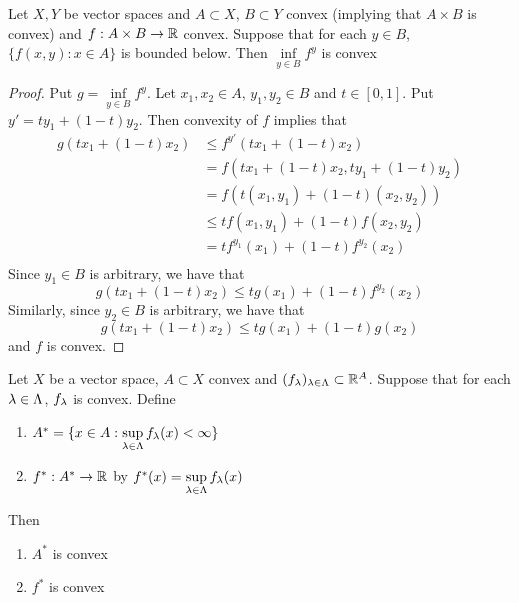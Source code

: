 \documentclass{book}
\begin{document}
	\begin{ex} 
	Let $X, Y$ be vector spaces and $A \subset X$, $B \subset Y$ convex (implying that $A \times B$ is convex)  and $f:A \times B \rightarrow \mathbb{R}$ convex. Suppose that for each $y \in B$, $\{f(x, y): x \in A\}$ is bounded below. Then $\inf\limits_{y \in B}f^y$ is convex
	\end{ex}
	
	\begin{proof}
	Put $g = \inf\limits_{y \in B}f^y$. 
	Let $x_1, x_2 \in A$, $y_1, y_2 \in B$ and $t \in [0,1]$. Put $y'= ty_1 + (1-t)y_2$. Then convexity of $f$ implies that
	\begin{align*}
	g(tx_1 + (1-t)x_2) 
	& \leq f^{y'}(tx_1 + (1-t)x_2) \\
	&= f(tx_1 + (1-t)x_2, ty_1 + (1-t)y_2)\\
	&= f(t(x_1,y_1) + (1-t)(x_2, y_2)) \\
	& \leq tf(x_1, y_1) + (1-t)f(x_2, y_2) \\
	&= tf^{y_1}(x_1) + (1-t)f^{y_2}(x_2) \\
	\end{align*}
	Since $y_1 \in B$ is arbitrary, we have that $$g(tx_1 + (1-t)x_2) \leq tg(x_1) + (1-t)f^{y_2}(x_2)$$ Similarly, since $y_2 \in B$ is arbitrary, we have that $$g(tx_1 + (1-t)x_2) \leq tg(x_1) + (1-t)g(x_2)$$ and $f$ is convex.
	\end{proof}	

	\begin{ex} 
	Let $X$ be a vector space, $A \subset X$ convex and $ (f_{\lambda})_{\lambda \in \Lambda} \subset \mathbb{R}^A$. Suppose that for each $\lambda \in \Lambda$, $f_\lambda$ is convex. Define 
	\begin{enumerate}
		\item $A^* = \{x \in A: \sup\limits_{\lambda \in \Lambda} f_{\lambda}(x) < \infty\}$
		\item $f^*:A^* \rightarrow \mathbb{R}$ by $f^*(x) =  \sup\limits_{\lambda \in \Lambda} f_{\lambda}(x)$
	\end{enumerate}
Then
	\begin{enumerate}
		\item $A^*$ is convex 
		\item $f^*$ is convex
	\end{enumerate}
	\end{ex}
	
\end{document}

